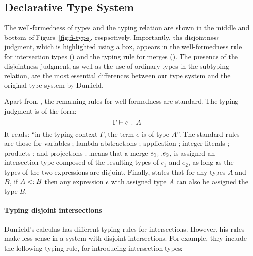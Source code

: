 
\subsection{Declarative Type System}

The well-formedness of types and the typing relation are shown in the
middle and bottom of Figure~\ref{fig:fi-type}, respectively.
Importantly, the disjointness judgment, which is highlighted using a
box, appears in the well-formedness rule for intersection types () and 
the typing rule for merges (). The presence of
the disjointness judgment, as well as the use of ordinary types in
the subtyping relation, are the most essential differences between our type system and the
original type system by Dunfield. 


Apart from , the remaining rules for 
well-formedness are standard. The typing judgment is of the form:
\[ \Gamma \vdash e \ \!:\! \ A \]
It reads: ``in the typing context $\Gamma$, the term $e$ is of type
$A$''. The standard rules are those for 
variables ; lambda abstractions ; 
application ; integer literals ;
products ; and projections . 
 means that a merge
$e_1 ,, e_2$, is assigned an intersection type composed of the
resulting types of $e_1$ and $e_2$, as long as the types of the two
expressions are disjoint.
Finally,  states that for any types $A$ and $B$, if
$A <: B$ then any expression $e$ with assigned type $A$ can also be assigned 
the type $B$.

\paragraph{Typing disjoint intersections}
Dunfield's calculus has different typing rules for intersections.
%
However, his rules
make less sense in a system with disjoint intersections. For example, 
they include the following typing rule, for
introducing intersection types:

